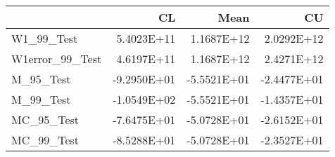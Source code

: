 \begin{tabular}{lrrr}
\toprule
{} &          CL &        Mean &          CU \\
\midrule
W1\_99\_Test      &  5.4023E+11 &  1.1687E+12 &  2.0292E+12 \\
W1error\_99\_Test &  4.6197E+11 &  1.1687E+12 &  2.4271E+12 \\
M\_95\_Test       & -9.2950E+01 & -5.5521E+01 & -2.4477E+01 \\
M\_99\_Test       & -1.0549E+02 & -5.5521E+01 & -1.4357E+01 \\
MC\_95\_Test      & -7.6475E+01 & -5.0728E+01 & -2.6152E+01 \\
MC\_99\_Test      & -8.5288E+01 & -5.0728E+01 & -2.3527E+01 \\
\bottomrule
\end{tabular}
